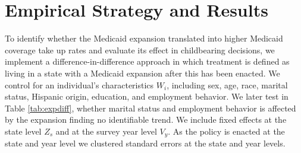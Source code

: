 \documentclass{article}
\begin{document}
\begin{comment}
Outcomes list:
\begin{itemize}
    \item Any coverage
    \item Medicaid
    \item Public insurance
    \item Employment insurance
    \item Number of children
    \item Dummy for new baby (<=1 years old)

\end{itemize}

Controls list:
\begin{itemize}
    \item Sex
    \item Age
    \item Race
    \item Hispanic
    \item Marital Status %
    \item Education
    \item Employment status
    \item Income
    \item Full-time worker dummy (40 hours or more a week)
\end{itemize}

Heterogeneity:
\begin{itemize}
    \item Sex
    \item Hispanic v. Not Hispanic
    \item Employment status
\end{itemize}
\end{comment}

\section{Empirical Strategy and Results}
To identify whether the Medicaid expansion translated into higher Medicaid coverage take up rates and evaluate its effect in childbearing decisions, we implement a difference-in-difference approach in which treatment is defined as living in a state with a Medicaid expansion after this has been enacted. We control for an individual's characteristics $W_{i}$, including sex, age, race, marital status, Hispanic origin, education, and employment behavior. We later test in Table \ref{tab:expdiff}, whether marital status and employment behavior is affected by the expansion finding no identifiable trend. We include fixed effects at the state level $Z_{s}$ and at the survey year level $V_{y}$. As the policy is enacted at the state and year level we clustered standard errors at the state and year levels.
\end{document}
